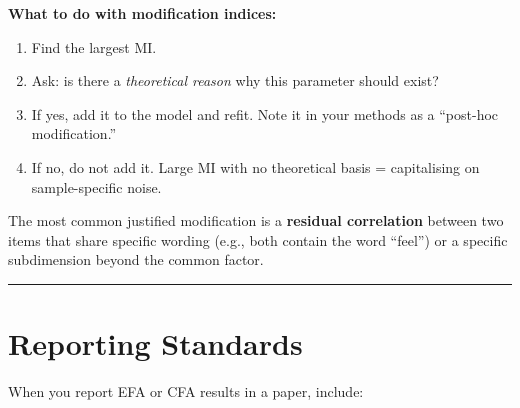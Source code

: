 \documentclass[
]{article}
\providecommand{\tightlist}{%
  \setlength{\itemsep}{0pt}\setlength{\parskip}{0pt}}
\begin{document}
\textbf{What to do with modification indices:}

\begin{enumerate}
\def\labelenumi{\arabic{enumi}.}
\tightlist
\item
  Find the largest MI.
\item
  Ask: is there a \emph{theoretical reason} why this parameter should
  exist?
\item
  If yes, add it to the model and refit. Note it in your methods as a
  ``post-hoc modification.''
\item
  If no, do not add it. Large MI with no theoretical basis =
  capitalising on sample-specific noise.
\end{enumerate}

The most common justified modification is a \textbf{residual
correlation} between two items that share specific wording (e.g., both
contain the word ``feel'') or a specific subdimension beyond the common
factor.

\begin{center}\rule{0.5\linewidth}{0.5pt}\end{center}

\section{Reporting Standards}\label{reporting-standards}

When you report EFA or CFA results in a paper, include:
\end{document}
